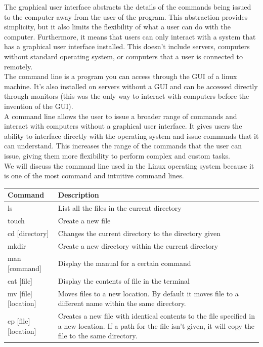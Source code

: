 The graphical user interface abstracts the details of the commands being issued to the computer away from the user of the program. This abstraction provides simplicity, but it also limits the flexibility of what a user can do with the computer. Furthermore, it means that users can only interact with a system that has a graphical user interface installed. This doesn’t include servers, computers without standard operating system, or computers that a user is connected to remotely. \\

The command line is a program you can access through the GUI of a linux machine. It’s also installed on servers without a GUI and can be accessed directly through monitors (this was the only way to interact with computers before the invention of the GUI).\\

A command line allows the user to issue a broader range of commands and interact with computers without a graphical user interface. It gives users the ability to interface directly with the operating system and issue commands that it can understand. This increases the range of the commands that the user can issue, giving them more flexibility to perform complex and custom tasks. \\

We will discuss the command line used in the Linux operating system because it is one of the most command and intuitive command lines. \\

\begin{center}
    \begin{tabular}{| l | p{75mm} | }
      \hline
      Command & Description \\ \hline
      ls & List all the files in the current directory \\ \hline
      touch & Create a new file \\ \hline
      cd [directory] & Changes the current directory to the directory given \\ \hline
      mkdir & Create a new directory within the current directory \\ \hline
      man [command] & Display the manual for a certain command \\ \hline
      cat [file] & Display the contents of file in the terminal \\ \hline
      mv [file] [location] & Moves files to a new location. \newline By default it moves file to a different name within the same directory. \\ \hline
      cp [file] [location] & Creates a new file with identical contents to the file specified in a new location. If a path for the file isn’t given, it will copy the file to the same directory. \\ \hline
    \end{tabular}
\end{center}
  
